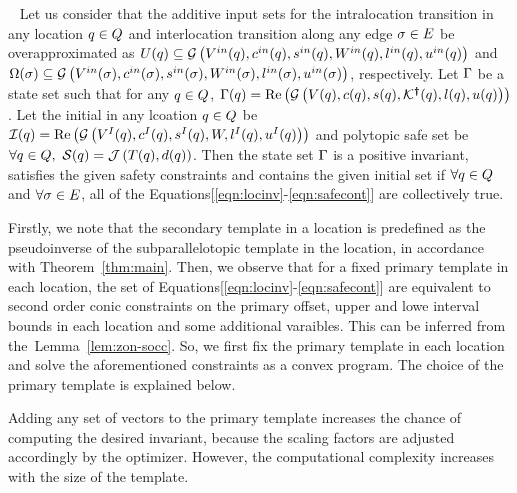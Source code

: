 \begin{theorem}~\label{thm:main} Let us consider that the additive input sets for the intralocation
  transition in any location $q\in Q$ and interlocation
  transition along any edge $\sigma\in E$ be overapproximated as
  $U(q)\subseteq \mathcal{G}\left(V^{in}(q),c^{in}(q),s^{in}(q),W^{in}(q),l^{in}(q),u^{in}(q)\right)$
  and
  $\Omega(\sigma)\subseteq \mathcal{G}\left(V^{in}(\sigma),c^{in}(\sigma),s^{in}(\sigma),W^{in}(\sigma),l^{in}(\sigma),u^{in}(\sigma)\right)$,
  respectively.  Let $\Gamma$ be a state set such that for any
  $q\in Q$, $\Gamma(q)
  = \operatorname{\operatorname{Re}}\left(\mathcal{G}\left(V(q),c(q),s(q),\mathcal{K}^{\bm{\dagger}}(q),l(q),u(q)\right)\right)$.
  Let the initial in any lcoation $q\in Q$ be
  $\mathcal{I}(q)=\operatorname{\operatorname{Re}}\left(\mathcal{G}\left(V^I(q),c^I(q),s^I(q),W,l^I(q),u^I(q)\right)\right)$
  and polytopic safe set be
  $\forall q\in Q,~\mathcal{S}(q)=\mathcal{J}\left(T(q),d(q)\right)$.
  Then the state set $\Gamma$ is a positive invariant, satisfies
  the given safety constraints and contains the given initial set if
  $\forall q\in Q$ and $\forall \sigma\in E$, all of
  the Equations[\ref{eqn:locinv}-\ref{eqn:safecont}] are collectively
  true.
\end{theorem}

  Firstly, we note that the secondary
template in a location is predefined as the pseudoinverse of the
subparallelotopic template in the location, in accordance with
Theorem~\ref{thm:main}.  Then, we observe that for a fixed primary
template in each location, the set of
Equations[\ref{eqn:locinv}-\ref{eqn:safecont}] are equivalent to
second order conic constraints on the primary offset, upper and lowe
interval bounds in each location and some additional varaibles.  This
can be inferred from the~Lemma~\ref{lem:zon-socc}. So, we first fix
the primary template in each location and solve the aforementioned
constraints as a convex program.  The choice of the primary template
is explained below.

  Adding any set of vectors to
the primary template increases the chance of computing the desired
invariant, because the scaling factors are adjusted accordingly by the
optimizer.  However, the computational complexity increases with the
size of the template.

